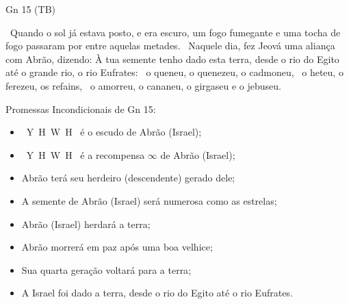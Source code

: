 \documentclass[12pt,aspectratio=169]{beamer}
\newcommand{\YA}{%
    \mbox{%
        Y\makebox[0pt][l]{\hspace{-0.178em}\raisebox{-0.00ex}{\scalebox{0.30}{E}}}%
        H\makebox[0pt][l]{\hspace{-0.010em}\raisebox{-0.00ex}{\scalebox{0.30}{O}}}%
        W\makebox[0pt][l]{\hspace{-0.245em}\raisebox{-0.00ex}{\scalebox{0.30}{A}}}%
        H%
    }%
}
\newcommand{\ver}[1]{%
    \raisebox{0.50ex}{%
        \scalebox{1.1}{%
            \pmb{\textbf{\textcolor{BSpbg}{#1}}}%
        }%
    }%
}
\newcommand{\QUOTE}[1]{%
    \par\noindent\hspace*{0.05\linewidth}%
    \begin{minipage}{0.9\linewidth}%
        \linespread{1.35}\large{#1}%
    \end{minipage}%
}
\newcommand{\YEL}[1]{{\textcolor{TXyel}{#1}}}
\newcommand{\GRE}[1]{{\textcolor{TXgre}{#1}}}
\newcommand{\CYA}[1]{{\textcolor{TXcya}{#1}}}
\newcommand{\BRI}[1]{{\textcolor{BSpbg}{#1}}}   %
\begin{document}
    \begin{frame}{Gn 15 (TB)}
        \QUOTE{%
            \ver{17}~Quando o sol já estava posto, e era escuro, um \YEL{fogo fumegante e uma
            tocha de fogo passaram por entre aquelas metades}.
            \ver{18}~Naquele dia, \YEL{fez Jeová uma aliança com Abrão}, dizendo: \GRE{À tua
            semente tenho dado esta terra, desde o rio do Egito até o grande rio, o rio
            Eufrates}:
            \ver{19}~o queneu, o quenezeu, o cadmoneu,
            \ver{20}~o heteu, o ferezeu, os refains,
            \ver{21}~o amorreu, o cananeu, o girgaseu e o jebuseu.
        }
    \end{frame}

    \begin{frame}{Promessas \YEL{Incondicionais} de \BRI{Gn 15}:}
        \begin{itemize}
            \item<1-> \BRI{\YA} é o \YEL{escudo} de Abrão (Israel);
            \item<2-> \BRI{\YA} é a \YEL{recompensa} $\infty$ de Abrão (Israel);
            \item<3-> Abrão terá seu herdeiro (descendente) \YEL{gerado dele};
            \item<4-> A semente de Abrão (Israel) será \YEL{numerosa} como as \CYA{estrelas};
            \item<5-> Abrão (Israel) \YEL{herdará} a \YEL{terra};
            \item<6-> Abrão morrerá em \YEL{paz} após uma \YEL{boa velhice};
            \item<7-> Sua quarta geração \YEL{voltará} para a \YEL{terra};
            \item<8-> \YEL{A Israel foi dado a terra, desde o rio do Egito até o rio Eufrates}.
        \end{itemize}
    \end{frame}

\end{document}
